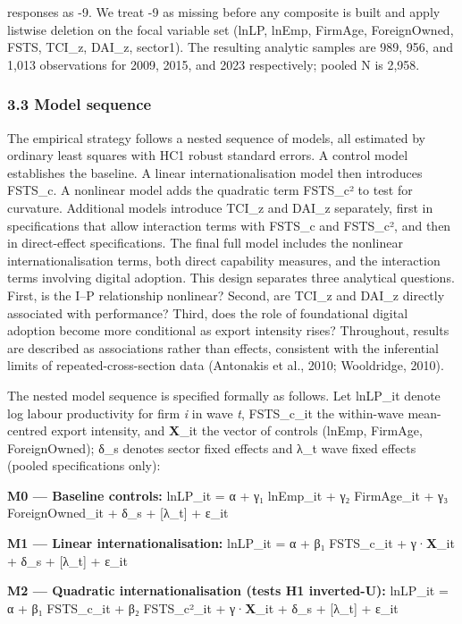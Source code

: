 \documentclass[12pt,a4paper]{article}
\begin{document}
responses as -9. We treat -9 as missing before any composite is built
and apply listwise deletion on the focal variable set (lnLP, lnEmp,
FirmAge, ForeignOwned, FSTS, TCI\_z, DAI\_z, sector1). The resulting
analytic samples are 989, 956, and 1,013 observations for 2009, 2015,
and 2023 respectively; pooled N is 2,958.

\hypertarget{33-model-sequence}{%
\subsubsection{3.3 Model sequence}\label{33-model-sequence}}

The empirical strategy follows a nested sequence of models, all
estimated by ordinary least squares with HC1 robust standard errors. A
control model establishes the baseline. A linear internationalisation
model then introduces FSTS\_c. A nonlinear model adds the quadratic term
FSTS\_c² to test for curvature. Additional models introduce TCI\_z and
DAI\_z separately, first in specifications that allow interaction terms
with FSTS\_c and FSTS\_c², and then in direct-effect specifications. The
final full model includes the nonlinear internationalisation terms, both
direct capability measures, and the interaction terms involving digital
adoption. This design separates three analytical questions. First, is
the I--P relationship nonlinear? Second, are TCI\_z and DAI\_z directly
associated with performance? Third, does the role of foundational
digital adoption become more conditional as export intensity rises?
Throughout, results are described as associations rather than effects,
consistent with the inferential limits of repeated-cross-section data
(Antonakis et al., 2010; Wooldridge, 2010).

The nested model sequence is specified formally as follows. Let lnLP\_it
denote log labour productivity for firm \emph{i} in wave \emph{t},
FSTS\_c\_it the within-wave mean-centred export intensity, and
\textbf{X}\_it the vector of controls (lnEmp, FirmAge, ForeignOwned);
δ\_s denotes sector fixed effects and λ\_t wave fixed effects (pooled
specifications only):

\textbf{M0 --- Baseline controls:} lnLP\_it = α + γ₁ lnEmp\_it + γ₂
FirmAge\_it + γ₃ ForeignOwned\_it + δ\_s + {[}λ\_t{]} + ε\_it

\textbf{M1 --- Linear internationalisation:} lnLP\_it = α + β₁
FSTS\_c\_it + γ·\textbf{X}\_it + δ\_s + {[}λ\_t{]} + ε\_it

\textbf{M2 --- Quadratic internationalisation (tests H1 inverted-U):}
lnLP\_it = α + β₁ FSTS\_c\_it + β₂ FSTS\_c²\_it + γ·\textbf{X}\_it +
δ\_s + {[}λ\_t{]} + ε\_it
\end{document}
